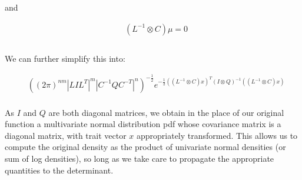 and

\begin{align*}
&(L^{-1} \otimes C)\mu = 0\\
\\
\end{align*}

We can further simplify this into:

\begin{align*}
&((2\pi)^{nm}|LIL^T|^m |C^{-1}QC^{-T}|^n)^{-\frac{1}{2}}e^{-\frac{1}{2}((L^{-1} \otimes C)x)^{T}(I \otimes Q)^{-1}((L^{-1} \otimes C)x)}\\
\end{align*}

As $I$ and $Q$ are both diagonal matrices, we obtain in the place of our original function a multivariate normal distribution pdf whose covariance matrix is a diagonal matrix, with trait vector $x$ appropriately transformed. This allows us to compute the original density as the product of univariate normal densities (or sum of log densities), so long as we take care to propagate the appropriate quantities to the determinant. 
